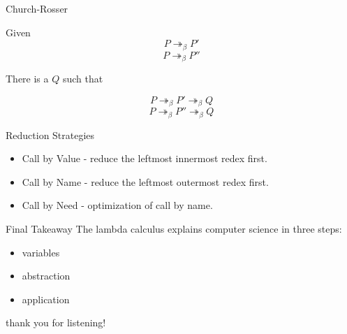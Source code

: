 \documentclass{beamer}
\begin{document}
\begin{frame}{Church-Rosser}
  \begin{theorem}
    Given $$P\twoheadrightarrow_\beta P'$$
          $$P\twoheadrightarrow_\beta P''$$

    There is a $Q$ such that

    $$P\twoheadrightarrow_\beta P'\twoheadrightarrow_\beta Q$$
    $$P\twoheadrightarrow_\beta P''\twoheadrightarrow_\beta Q$$

  \end{theorem}
\end{frame}

\begin{frame}{Reduction Strategies}
  \begin{itemize}
    \item Call by Value - reduce the leftmost innermost redex first.
    \item Call by Name - reduce the leftmost outermost redex first.
    \item Call by Need - optimization of call by name.
  \end{itemize}
\end{frame}

\begin{frame}{Final Takeaway}
  The lambda calculus explains computer science in three steps:
  \begin{itemize}
    \item variables
    \item abstraction
    \item application
  \end{itemize}
\end{frame}

\begin{frame}
  \centering
  thank you for listening!
\end{frame}
\end{document}

